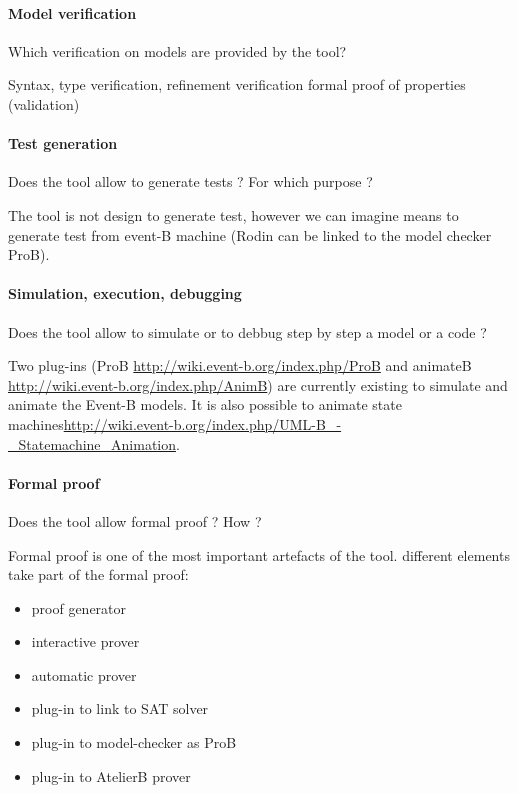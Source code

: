 \paragraph{Model verification}
Which verification on models are provided by the tool?

\begin{author_comment}

Syntax, type verification,
refinement verification
formal proof of properties (validation)
\end{author_comment}

\paragraph{Test generation}
Does the tool allow to generate tests ? For  which purpose ?

\begin{author_comment}

The tool is not design to generate test, however we can imagine means to  generate test from event-B machine (Rodin can be linked to the model checker ProB).
\end{author_comment}

\paragraph{Simulation, execution, debugging}
Does the tool allow to simulate or to debbug step by step a model or a code ?

\begin{author_comment}

Two plug-ins (ProB \url{http://wiki.event-b.org/index.php/ProB} and animateB \url{http://wiki.event-b.org/index.php/AnimB}) are currently existing to simulate and animate the Event-B models. It is also possible to animate state machines\url{http://wiki.event-b.org/index.php/UML-B_-_Statemachine_Animation}.
\end{author_comment}

\paragraph{Formal proof}
Does the tool allow formal proof ?  How ?

\begin{author_comment}

Formal proof is one of the most important artefacts of the tool. different elements take part of the formal proof:
\begin{itemize}
\item proof generator
\item interactive prover
\item automatic prover
\item plug-in to link to SAT solver
\item plug-in to model-checker as ProB
\item plug-in to AtelierB prover
\end{itemize}
\end{author_comment}



